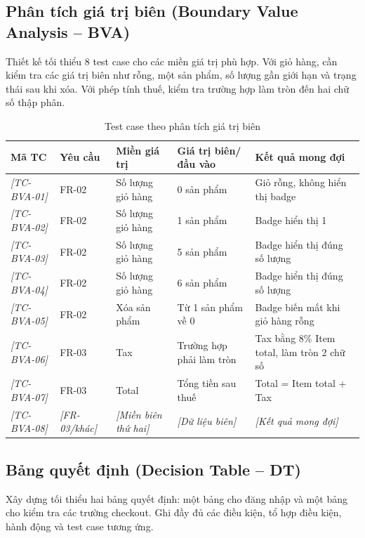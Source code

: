 \documentclass[a4paper,12pt]{article}
\newcommand{\fillin}[1]{\textit{[#1]}}
\begin{document}
\subsection{Phân tích giá trị biên (Boundary Value Analysis -- BVA)}
Thiết kế tối thiểu 8 test case cho các miền giá trị phù hợp. Với giỏ hàng, cần kiểm tra các giá trị biên như rỗng, một sản phẩm, số lượng gần giới hạn và trạng thái sau khi xóa. Với phép tính thuế, kiểm tra trường hợp làm tròn đến hai chữ số thập phân.
\begin{table}[htbp]
\centering
\caption{Test case theo phân tích giá trị biên}
\small
\begin{tabularx}{\textwidth}{|p{1.8cm}|p{2.1cm}|p{2.2cm}|X|X|}
\hline
\textbf{Mã TC} & \textbf{Yêu cầu} & \textbf{Miền giá trị} & \textbf{Giá trị biên/đầu vào} & \textbf{Kết quả mong đợi} \\
\hline
\fillin{TC-BVA-01} & FR-02 & Số lượng giỏ hàng & 0 sản phẩm & Giỏ rỗng, không hiển thị badge \\
\hline
\fillin{TC-BVA-02} & FR-02 & Số lượng giỏ hàng & 1 sản phẩm & Badge hiển thị 1 \\
\hline
\fillin{TC-BVA-03} & FR-02 & Số lượng giỏ hàng & 5 sản phẩm & Badge hiển thị đúng số lượng \\
\hline
\fillin{TC-BVA-04} & FR-02 & Số lượng giỏ hàng & 6 sản phẩm & Badge hiển thị đúng số lượng \\
\hline
\fillin{TC-BVA-05} & FR-02 & Xóa sản phẩm & Từ 1 sản phẩm về 0 & Badge biến mất khi giỏ hàng rỗng \\
\hline
\fillin{TC-BVA-06} & FR-03 & Tax & Trường hợp phải làm tròn & Tax bằng 8\% Item total, làm tròn 2 chữ số \\
\hline
\fillin{TC-BVA-07} & FR-03 & Total & Tổng tiền sau thuế & Total = Item total + Tax \\
\hline
\fillin{TC-BVA-08} & \fillin{FR-03/khác} & \fillin{Miền biên thứ hai} & \fillin{Dữ liệu biên} & \fillin{Kết quả mong đợi} \\
\hline
\end{tabularx}
\end{table}

\subsection{Bảng quyết định (Decision Table -- DT)}
Xây dựng tối thiểu hai bảng quyết định: một bảng cho đăng nhập và một bảng cho kiểm tra các trường checkout. Ghi đầy đủ các điều kiện, tổ hợp điều kiện, hành động và test case tương ứng.
\end{document}
